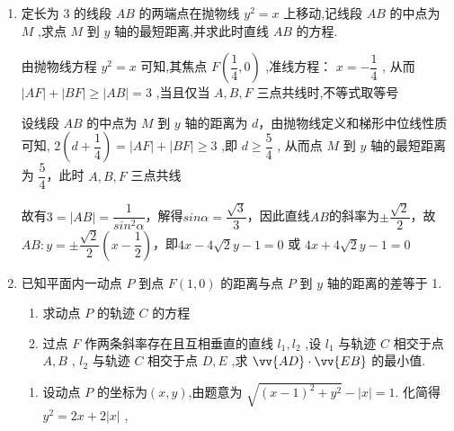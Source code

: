 \begin{enumerate}
\begin{enumerate}
\begin{jieda}
\begin{enumerate}
                \item 方法2
    
                设抛物线上的点为$(x_0, x_0^2)$，其到直线的距离$d = \dfrac{|2x_0-x_0^2-4|}{\sqrt{5}} = \dfrac{x_0^2-2x_0+4}{\sqrt{5}}$，当$x_0 = 1$时取得最小值，故目标点坐标为$(1,1)$
            \end{enumerate}
        \end{jieda}
        
        \item 定长为 3 的线段 ${AB}$ 的两端点在抛物线 ${y}^{2} = x$ 上移动,记线段 ${AB}$ 的中点为 $M$ ,求点 $M$ 到 $y$ 轴的最短距离,并求此时直线 ${AB}$ 的方程.
        \begin{jieda}
            由抛物线方程 $y^2 = x$ 可知,其焦点 $F\left( {\dfrac{1}{4},0}\right)$ ,准线方程： $x =  - \dfrac{1}{4}$ ,
            从而 $\left| {AF}\right|  + \left| {BF}\right|  \geq  \left| {AB}\right|  = 3$ ,当且仅当 $A,B,F$ 三点共线时,不等式取等号
            
            设线段 ${AB}$ 的中点为 $M$ 到 $y$ 轴的距离为 $d$，由抛物线定义和梯形中位线性质可知, $2\left( {d + \dfrac{1}{4}}\right)  = \left| {AF}\right|  + \left| {BF}\right|  \geq  3$ ,即 $d \geq  \dfrac{5}{4}$ ,
            从而点 $M$ 到 $y$ 轴的最短距离为 $\dfrac{5}{4}$，此时 $A,B,F$ 三点共线
            
            故有$3 = |AB| = \dfrac{1}{sin^2\alpha}$，解得$sin\alpha = \dfrac{\sqrt{3}}{3}$，因此直线$AB$的斜率为$\pm \dfrac{\sqrt{2}}{2}$，故$AB: y = \pm \dfrac{\sqrt{2}}{2}\left(x-\dfrac{1}{2}\right)$，即${4x} - 4\sqrt{2}y - 1 = 0$ 或 ${4x} + 4\sqrt{2}y - 1 = 0$
        \end{jieda}
        \item 已知平面内一动点 $P$ 到点 ${F}\left( {1,0}\right)$ 的距离与点 $P$ 到 $y$ 轴的距离的差等于 1.
        \begin{enumerate}
            \item 求动点 $P$ 的轨迹 $C$ 的方程
            \item 过点 $F$ 作两条斜率存在且互相垂直的直线 ${l}_{1},{l}_{2}$ ,设 ${l}_{1}$ 与轨迹 $C$ 相交于点 $A,B$ , ${l}_{2}$ 与轨迹 $C$ 相交于点 $D,E$ ,求 $\vv{AD} \cdot  \vv{EB}$ 的最小值.
        \end{enumerate}
        \begin{jieda}
            \begin{enumerate}
                \item 设动点 $P$ 的坐标为$(x, y)$,由题意为 $\sqrt{{\left( x - 1\right) }^{2} + {y}^{2}} - \left| x\right|  = 1$. 化简得 ${y}^{2} = {2x} + 2\left| x\right|$ ,
                

\end{enumerate}
\end{jieda}
\end{enumerate}
\end{enumerate}
